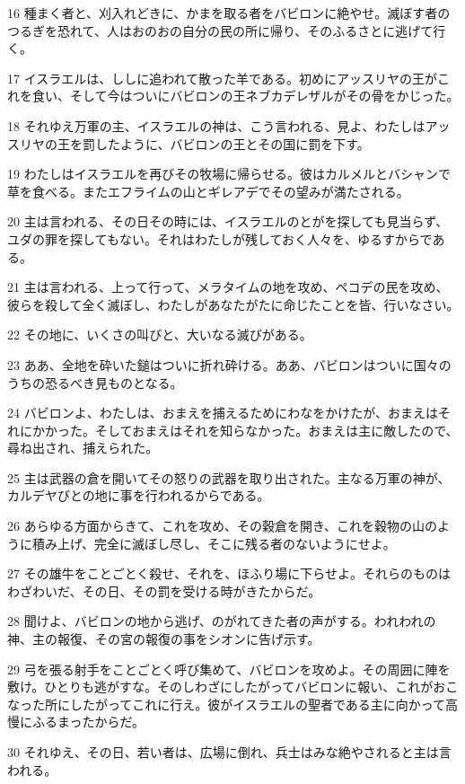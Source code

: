 \par 16 種まく者と、刈入れどきに、かまを取る者をバビロンに絶やせ。滅ぼす者のつるぎを恐れて、人はおのおの自分の民の所に帰り、そのふるさとに逃げて行く。
\par 17 イスラエルは、ししに追われて散った羊である。初めにアッスリヤの王がこれを食い、そして今はついにバビロンの王ネブカデレザルがその骨をかじった。
\par 18 それゆえ万軍の主、イスラエルの神は、こう言われる、見よ、わたしはアッスリヤの王を罰したように、バビロンの王とその国に罰を下す。
\par 19 わたしはイスラエルを再びその牧場に帰らせる。彼はカルメルとバシャンで草を食べる。またエフライムの山とギレアデでその望みが満たされる。
\par 20 主は言われる、その日その時には、イスラエルのとがを探しても見当らず、ユダの罪を探してもない。それはわたしが残しておく人々を、ゆるすからである。
\par 21 主は言われる、上って行って、メラタイムの地を攻め、ペコデの民を攻め、彼らを殺して全く滅ぼし、わたしがあなたがたに命じたことを皆、行いなさい。
\par 22 その地に、いくさの叫びと、大いなる滅びがある。
\par 23 ああ、全地を砕いた鎚はついに折れ砕ける。ああ、バビロンはついに国々のうちの恐るべき見ものとなる。
\par 24 バビロンよ、わたしは、おまえを捕えるためにわなをかけたが、おまえはそれにかかった。そしておまえはそれを知らなかった。おまえは主に敵したので、尋ね出され、捕えられた。
\par 25 主は武器の倉を開いてその怒りの武器を取り出された。主なる万軍の神が、カルデヤびとの地に事を行われるからである。
\par 26 あらゆる方面からきて、これを攻め、その穀倉を開き、これを穀物の山のように積み上げ、完全に滅ぼし尽し、そこに残る者のないようにせよ。
\par 27 その雄牛をことごとく殺せ、それを、ほふり場に下らせよ。それらのものはわざわいだ、その日、その罰を受ける時がきたからだ。
\par 28 聞けよ、バビロンの地から逃げ、のがれてきた者の声がする。われわれの神、主の報復、その宮の報復の事をシオンに告げ示す。
\par 29 弓を張る射手をことごとく呼び集めて、バビロンを攻めよ。その周囲に陣を敷け。ひとりも逃がすな。そのしわざにしたがってバビロンに報い、これがおこなった所にしたがってこれに行え。彼がイスラエルの聖者である主に向かって高慢にふるまったからだ。
\par 30 それゆえ、その日、若い者は、広場に倒れ、兵士はみな絶やされると主は言われる。

